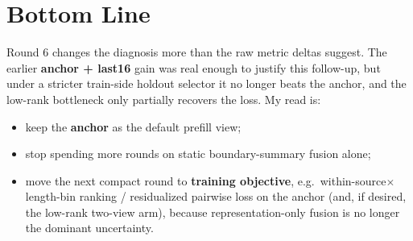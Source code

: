 \documentclass[11pt]{article}
\begin{document}
\section*{Bottom Line}
Round 6 changes the diagnosis more than the raw metric deltas suggest. The earlier \textbf{anchor + last16} gain was real enough to justify this follow-up, but under a stricter train-side holdout selector it no longer beats the anchor, and the low-rank bottleneck only partially recovers the loss. My read is:
\begin{itemize}
  \item keep the \textbf{anchor} as the default prefill view;
  \item stop spending more rounds on static boundary-summary fusion alone;
  \item move the next compact round to \textbf{training objective}, e.g.\ within-source$\times$length-bin ranking / residualized pairwise loss on the anchor (and, if desired, the low-rank two-view arm), because representation-only fusion is no longer the dominant uncertainty.
\end{itemize}
\end{document}
